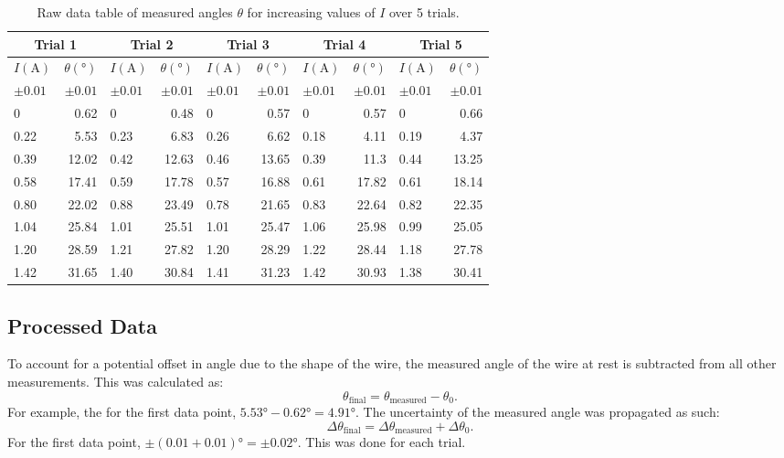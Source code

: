 \begin{table}[H]
	\centering
	\begin{tabular}{|lr||lr||lr||lr||lr|}
		\hline
		\multicolumn{2}{|c||}{Trial 1} & \multicolumn{2}{|c||}{Trial 2} & \multicolumn{2}{c||}{Trial 3}& \multicolumn{2}{c||}{Trial 4}& \multicolumn{2}{c|}{Trial 5} \\
		\hline
		$I(\si{\ampere})$ & $\theta(\si{\degree})$ & $I(\si{\ampere})$ & $\theta(\si{\degree})$ & $I(\si{\ampere})$ & $\theta(\si{\degree})$ & $I(\si{\ampere})$ & $\theta(\si{\degree})$ & $I(\si{\ampere})$ & $\theta(\si{\degree})$ \\
		$\pm0.01$ & $\pm0.01$ & $\pm0.01$ & $\pm0.01$ & $\pm0.01$ & $\pm0.01$ & $\pm0.01$ & $\pm0.01$ & $\pm0.01$ & $\pm0.01$ \\
		\hline
		0 & 0.62 & 0 & 0.48 & 0 & 0.57 & 0 & 0.57 & 0 & 0.66 \\
		0.22 & 5.53 & 0.23 & 6.83 & 0.26 & 6.62 & 0.18 & 4.11 & 0.19 & 4.37 \\
		0.39 & 12.02 & 0.42 & 12.63 & 0.46 & 13.65 & 0.39 & 11.3 & 0.44 & 13.25 \\
		0.58 & 17.41 & 0.59 & 17.78 & 0.57 & 16.88 & 0.61 & 17.82 & 0.61 & 18.14 \\
		0.80 & 22.02 & 0.88 & 23.49 & 0.78 & 21.65 & 0.83 & 22.64 & 0.82 & 22.35 \\
		1.04 & 25.84 & 1.01 & 25.51 & 1.01 & 25.47 & 1.06 & 25.98 & 0.99 & 25.05 \\
		1.20 & 28.59 & 1.21 & 27.82 & 1.20 & 28.29 & 1.22 & 28.44 & 1.18 & 27.78 \\
		1.42 & 31.65 & 1.40 & 30.84 & 1.41 & 31.23 & 1.42 & 30.93 & 1.38 & 30.41 \\
		\hline
	\end{tabular}
	\caption{Raw data table of measured angles $\theta$ for increasing values of $I$ over 5 trials.}
	\label{tab:raw1}
\end{table}

\newpage

\subsection*{Processed Data}

To account for a potential offset in angle due to the shape of the wire, the measured angle of the wire at rest is subtracted from all other measurements.
This was calculated as:
\begin{equation*}
	\theta_{\text{final}} = \theta_{\text{measured}} - \theta_0 \text{.}
\end{equation*}
For example, the for the first data point, $5.53\si{\degree} - 0.62\si{\degree} = 4.91\si{\degree}$.
The uncertainty of the measured angle was propagated as such:
\begin{equation*}
	\Delta\theta_{\text{final}} = \Delta\theta_{\text{measured}} + \Delta\theta_0 \text{.}
\end{equation*}
For the first data point, $\pm(0.01 + 0.01)\si{\degree} = \pm0.02\si{\degree}$.
This was done for each trial.

